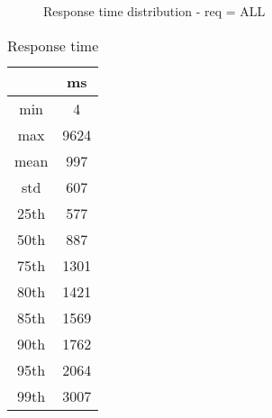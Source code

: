 \begin{minipage}{0.75\linewidth}
\begin{figure}[h]
\begin{adjustbox}{max width=1.0\linewidth, keepaspectratio}
  \end{adjustbox}
  \caption{Response time distribution - req = ALL}
\end{figure}
\end{minipage}\hfill\begin{minipage}{0.18\linewidth}
\begin{table}[h]
\begin{tabular}{|cc|}
\hline
\textbf{} & \textbf{ms}\\ \hline
 \Xhline{0.005\arrayrulewidth}
min & 4\\
 \Xhline{0.005\arrayrulewidth}
max & 9624\\
 \Xhline{0.005\arrayrulewidth}
mean & 997\\
 \Xhline{0.005\arrayrulewidth}
std & 607\\
\hline
\hline
 \Xhline{0.005\arrayrulewidth}
25th & 577\\
 \Xhline{0.005\arrayrulewidth}
50th & 887\\
 \Xhline{0.005\arrayrulewidth}
75th & 1301\\
 \Xhline{0.005\arrayrulewidth}
80th & 1421\\
 \Xhline{0.005\arrayrulewidth}
85th & 1569\\
 \Xhline{0.005\arrayrulewidth}
90th & 1762\\
 \Xhline{0.005\arrayrulewidth}
95th & 2064\\
 \Xhline{0.005\arrayrulewidth}
99th & 3007\\
\hline
\end{tabular}
\caption{Response time}
\end{table}
\end{minipage}\hfill